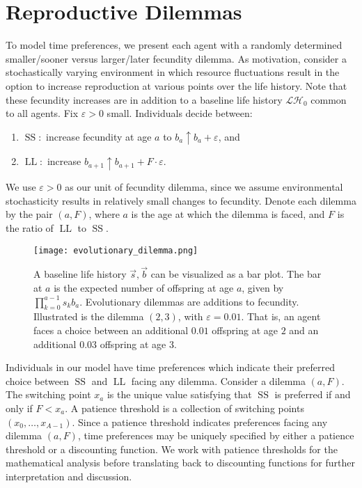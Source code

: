 \documentclass[titlepage, hidelinks, 12pt]{article}
\theoremstyle{plain}
\theoremstyle{remark}
\theoremstyle{definition}
\newcommand{\LH}{\mathcal{LH}}
\DeclareMathOperator{\smallersooner}{SS}
\DeclareMathOperator{\largerlater}{LL}
\begin{document}
\section{Reproductive Dilemmas}
To model time preferences, we present each agent with a randomly determined
smaller/sooner versus larger/later fecundity dilemma.  As motivation, consider
a stochastically varying environment in which resource fluctuations result in the option to
increase reproduction at various points over the life history. Note that these fecundity increases are in addition to a baseline life history
$\LH_0$ common to all agents.  
Fix $\varepsilon > 0$ small.  
Individuals decide between:
\begin{enumerate}
    \item $\smallersooner:$ increase fecundity at age $a$ to $b_a\uparrow b_{a} + \varepsilon$, and
    \item $\largerlater:$ increase $b_{a+1}\uparrow b_{a+1} + F\cdot \varepsilon$.
\end{enumerate}
We use $\varepsilon > 0$ as our unit of fecundity dilemma, since we assume environmental stochasticity results in relatively small changes to 
fecundity. 
Denote each dilemma by the pair $(a, F)$, where $a$ is the age at which the dilemma is faced,
and $F$ is the ratio of $\largerlater$ to $\smallersooner$. 

\begin{figure}[H]
    \centering
    \texttt{[image: evolutionary\_dilemma.png]}
    \caption{A baseline life history $\vec{s}, \vec{b}$ can be visualized as a bar plot. The bar at $a$ is the expected number of offspring at
        age $a$, given by
    $\prod_{k = 0}^{a-1} s_k b_a$. Evolutionary dilemmas are additions to fecundity. Illustrated is the dilemma $(2, 3)$, with
$\varepsilon = 0.01$. That is, an agent faces a choice between an additional $0.01$ offspring at age $2$ and an additional $0.03$ offspring
at age $3$.} 
\end{figure}

Individuals in our model have time preferences which indicate their preferred choice between $\smallersooner$ and $\largerlater$ facing any
dilemma. 
Consider a dilemma $(a, F)$. The switching point $x_a$ is the unique value satisfying that $\smallersooner$ is preferred
if and only if $F < x_a$. 
A patience threshold is a collection of switching points $(x_0, \ldots, x_{A-1})$.
Since a patience threshold indicates preferences facing any dilemma $(a, F)$, time preferences may be uniquely 
specified by either a patience threshold or a discounting function. We work with patience thresholds
for the mathematical analysis before translating back to discounting functions for further interpretation and discussion. 
\end{document}
